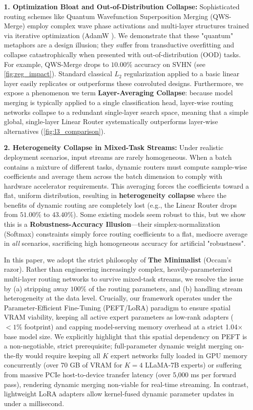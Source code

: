 \textbf{1. Optimization Bloat and Out-of-Distribution Collapse:} Sophisticated routing schemes like Quantum Wavefunction Superposition Merging (QWS-Merge) \cite{PredecessorT4S10} employ complex wave phase activations and multi-layer structures trained via iterative optimization (AdamW \cite{Loshchilov2017}). We demonstrate that these "quantum" metaphors are a design illusion; they suffer from transductive overfitting \cite{PredecessorT2S1} and collapse catastrophically when presented with out-of-distribution (OOD) tasks. For example, QWS-Merge drops to $10.00\%$ accuracy on SVHN (see \cref{fig:reg_impact}). Standard classical $L_2$ regularization applied to a basic linear layer easily replicates or outperforms these convoluted designs. Furthermore, we expose a phenomenon we term \textbf{Layer-Averaging Collapse}: because model merging is typically applied to a single classification head, layer-wise routing networks collapse to a redundant single-layer search space, meaning that a simple global, single-layer Linear Router systematically outperforms layer-wise alternatives (\cref{fig:l3_comparison}).

\textbf{2. Heterogeneity Collapse in Mixed-Task Streams:} Under realistic deployment scenarios, input streams are rarely homogeneous. When a batch contains a mixture of different tasks, dynamic routers must compute sample-wise coefficients and average them across the batch dimension to comply with hardware accelerator requirements. This averaging forces the coefficients toward a flat, uniform distribution, resulting in \textbf{heterogeneity collapse} where the benefits of dynamic routing are completely lost (e.g., the Linear Router drops from $51.00\%$ to $43.40\%$). Some existing models seem robust to this, but we show this is a \textbf{Robustness-Accuracy Illusion}---their simplex-normalization (Softmax) constraints simply force routing coefficients to a flat, mediocre average in \emph{all} scenarios, sacrificing high homogeneous accuracy for artificial "robustness".

In this paper, we adopt the strict philosophy of \textbf{The Minimalist} (Occam's razor). Rather than engineering increasingly complex, heavily-parameterized multi-layer routing networks to survive mixed-task streams, we resolve the issue by (a) stripping away $100\%$ of the routing parameters, and (b) handling stream heterogeneity at the data level. Crucially, our framework operates under the Parameter-Efficient Fine-Tuning (PEFT/LoRA) paradigm to ensure spatial VRAM viability, keeping all active expert parameters as low-rank adapters ($<1\%$ footprint) and capping model-serving memory overhead at a strict 1.04$\times$ base model size. We explicitly highlight that this spatial dependency on PEFT is a non-negotiable, strict prerequisite; full-parameter dynamic weight merging on-the-fly would require keeping all $K$ expert networks fully loaded in GPU memory concurrently (over 70 GB of VRAM for $K=4$ LLaMA-7B experts) or suffering from massive PCIe host-to-device transfer latency (over 5,000 ms per forward pass), rendering dynamic merging non-viable for real-time streaming. In contrast, lightweight LoRA adapters allow kernel-fused dynamic parameter updates in under a millisecond.


